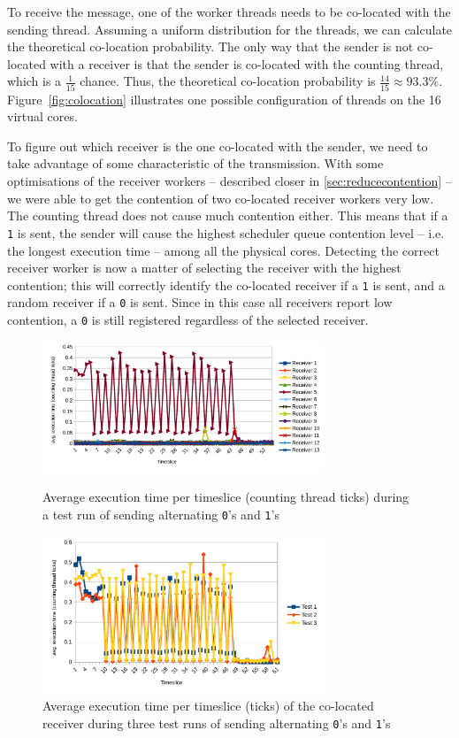 \documentclass[11pt,
  titlepage=false,
]{scrreprt}
\begin{document}
To receive the message, one of the worker threads needs to be co-located with the sending thread.
Assuming a uniform distribution for the threads, we can calculate the theoretical co-location probability.
The only way that the sender is not co-located with a receiver is that the sender is co-located with the counting thread,
which is a $\frac{1}{15}$ chance.
Thus, the theoretical co-location probability is $\frac{14}{15} \approx 93.3\%$.
Figure~\ref{fig:colocation} illustrates one possible configuration of threads on the 16 virtual cores.

To figure out which receiver is the one co-located with the sender,
we need to take advantage of some characteristic of the transmission.
With some optimisations of the receiver workers -- described closer in \ref{sec:reducecontention} --
we were able to get the contention of two co-located receiver workers very low.
The counting thread does not cause much contention either.
This means that if a \texttt{1} is sent, the sender will cause the highest scheduler queue contention level -- i.e. the longest execution time --
among all the physical cores.
Detecting the correct receiver worker is now a matter of selecting the receiver with the highest contention;
this will correctly identify the co-located receiver if a \texttt{1} is sent, and a random receiver if a \texttt{0} is sent.
Since in this case all receivers report low contention, a \texttt{0} is still registered regardless of the selected receiver.

\begin{figure}
    \centering
    \includegraphics[width=0.75\textwidth]{figures/contentiontest}

    \caption{Average execution time per timeslice (counting thread ticks) during a test run of sending alternating \texttt{0}'s and \texttt{1}'s}
    \label{fig:contentiontest}
    \centering
    \includegraphics[width=0.75\textwidth]{figures/contentioncoalesced}

    \caption{Average execution time per timeslice (ticks) of the co-located receiver during three test runs of sending alternating \texttt{0}'s and \texttt{1}'s}
    \label{fig:contentioncoalesced}
\end{figure}
\end{document}
